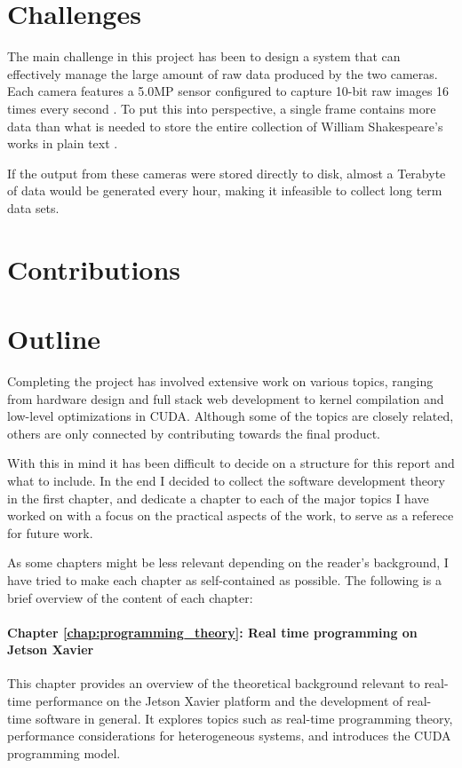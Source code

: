 \section{Challenges}
The main challenge in this project has been to design a system that can effectively manage the large amount of raw data produced by the two cameras.
Each camera features a 5.0MP sensor configured to capture 10-bit raw images 16 times every second \cite{lucidvisionlabsTriton0MPPolarization}.
To put this into perspective, a single frame contains more data than what is needed to store the entire collection of William Shakespeare's works in plain text \cite{projectgutenbergCompleteWorksWilliam1994}.

If the output from these cameras were stored directly to disk, almost a Terabyte of data would be generated every hour, making it infeasible to collect long term data sets.
\section{Contributions}



\section{Outline}
Completing the \sr project has involved extensive work on various topics, ranging from hardware design and full stack web development to kernel compilation and low-level optimizations in CUDA.
Although some of the topics are closely related, others are only connected  by contributing towards the final product.

With this in mind it has been difficult to decide on a structure for this report and what to include.
In the end I decided to collect the software development theory in the first chapter, and dedicate a chapter to each of the major topics I have worked on with a focus on the practical aspects of the work, to serve as a referece for future work.

As some chapters might be less relevant depending on the reader's background, I have tried to make each chapter as self-contained as possible.
The following is a brief overview of the content of each chapter:

\paragraph{Chapter \ref{chap:programming_theory}: Real time programming on Jetson Xavier}
This chapter provides an overview of the theoretical background relevant to real-time performance on the Jetson Xavier platform and the development of real-time software in general. It explores topics such as real-time programming theory, performance considerations for heterogeneous systems, and introduces the CUDA programming model.

